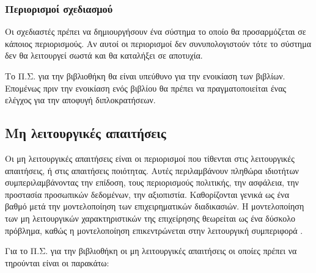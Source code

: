 \documentclass{assignment}
\begin{document}
\subsubsection{Περιορισμοί σχεδιασμού}

Οι σχεδιαστές πρέπει να δημιουργήσουν ένα σύστημα το οποίο θα προσαρμόζεται σε κάποιος περιορισμούς. Αν αυτοί οι περιορισμοί δεν συνυπολογιστούν τότε το σύστημα δεν θα λειτουργεί σωστά και θα καταλήξει σε αποτυχία. 

Το Π.Σ. για την βιβλιοθήκη θα είναι υπεύθυνο για την ενοικίαση των βιβλίων. Επομένως πριν την ενοικίαση ενός βιβλίου θα πρέπει να πραγματοποιείται ένας ελέγχος για την αποφυγή διπλοκρατήσεων.

\subsection{Μη λειτουργικές απαιτήσεις}

Οι μη λειτουργικές απαιτήσεις είναι οι περιορισμοί που τίθενται στις λειτουργικές απαιτήσεις, ή στις απαιτήσεις ποιότητας. Αυτές περιλαμβάνουν πληθώρα ιδιοτήτων συμπεριλαμβάνοντας την επίδοση, τους περιορισμούς πολιτικής, την ασφάλεια, την προστασία προσωπικών δεδομένων, την αξιοπιστία. Καθορίζονται γενικά ως ένα βαθμό μετά την μοντελοποίηση των επιχειρηματικών διαδικασιών. Η μοντελοποίηση των μη λειτουργικών χαρακτηριστικών της επιχείρησης θεωρείται ως ένα δύσκολο πρόβλημα, καθώς η μοντελοποίηση επικεντρώνεται στην λειτουργική συμπεριφορά \cite{triadis}.

Για το Π.Σ. για την βιβλιοθήκη οι μη λειτουργικές απαιτήσεις οι οποίες πρέπει να τηρούνται είναι οι παρακάτω:
\end{document}
